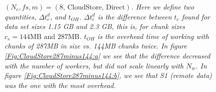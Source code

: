 \documentclass{rspublic}
\begin{document}
\begin{figure}
\begin{center}
\caption{\textit{$(N_c, fs, m) = (\mbox{8, CloudStore, Direct})$. Here
we define two quantities, $\Delta t_c^d$, and $t_{OH}$. $\Delta t_c^d$
is the difference between $t_c$ found for data set sizes 1.15 GB and
2.3 GB, this is, for chunk sizes $c_s = 144\mbox{MB and } 287\mbox{MB}$.
$t_{OH}$ is the overhead time of working with chunks of 287MB in size
vs. 144MB chunks twice. In figure \ref{Fig:CloudStore287minus144:a} we
see that the difference decreased with the number of workers, but did
not scale linearly with $N_w$. In figure
\ref{Fig:CloudStore287minus144:b}, we see that S1 (remote data)
was the one with the most overhead.}}
\label{Fig:CloudStore287minus144}
\end{center}
\end{figure}
\end{document}
